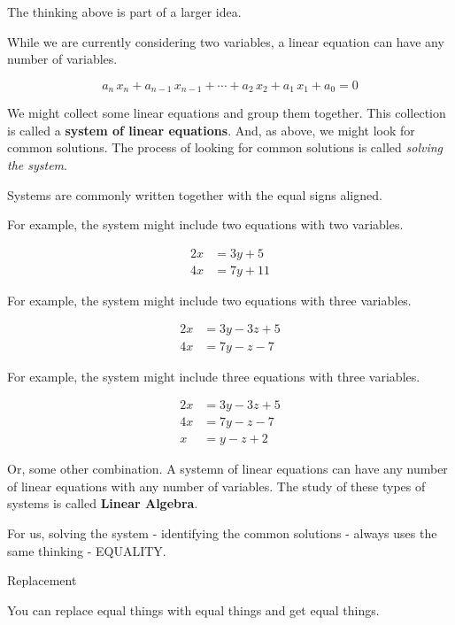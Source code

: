 \documentclass{ximera}
\begin{document}
The thinking above is part of a larger idea.


While we are currently considering two variables, a linear equation can have any number of variables.


\[
a_n \, x_n + a_{n-1} \, x_{n-1} + \cdots + a_2 \, x_2 + a_1 \, x_1 + a_0 = 0
\]


We might collect some linear equations and group them together. This collection is called a \textbf{system of linear equations}. And, as above, we might look for common solutions.  The process of looking for common solutions is called \textit{solving the system}.





Systems are commonly written together with the equal signs aligned.

For example, the system might include two equations with two variables.

\begin{align*}
2x & = 3y + 5 \\
4x & = 7y + 11
\end{align*}



For example, the system might include two equations with three variables.

\begin{align*}
2x & = 3y - 3z + 5 \\
4x & = 7y - z - 7
\end{align*}




For example, the system might include three equations with three variables.

\begin{align*}
2x & = 3y - 3z + 5 \\
4x & = 7y - z - 7 \\
x & = y - z + 2 
\end{align*}


Or, some other combination. A systemn of linear equations can have any number of linear equations with any number of variables.  The study of these types of systems is called \textbf{Linear Algebra}.

For us, solving the system - identifying the common solutions - always uses the same thinking - EQUALITY.



\begin{fact} Replacement

You can replace equal things with equal things and get equal things.

\end{fact}
\end{document}
